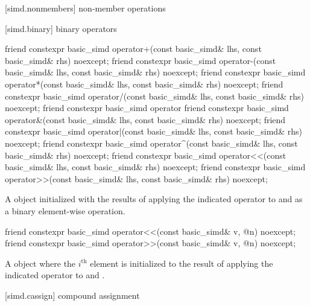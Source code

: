 [simd.nonmembers]{ non-member operations}

[simd.binary]{ binary operators}

\begin{itemdecl}
friend constexpr basic_simd operator+(const basic_simd& lhs, const basic_simd& rhs) noexcept;
friend constexpr basic_simd operator-(const basic_simd& lhs, const basic_simd& rhs) noexcept;
friend constexpr basic_simd operator*(const basic_simd& lhs, const basic_simd& rhs) noexcept;
friend constexpr basic_simd operator/(const basic_simd& lhs, const basic_simd& rhs) noexcept;
friend constexpr basic_simd operator%
friend constexpr basic_simd operator&(const basic_simd& lhs, const basic_simd& rhs) noexcept;
friend constexpr basic_simd operator|(const basic_simd& lhs, const basic_simd& rhs) noexcept;
friend constexpr basic_simd operator^(const basic_simd& lhs, const basic_simd& rhs) noexcept;
friend constexpr basic_simd operator<<(const basic_simd& lhs, const basic_simd& rhs) noexcept;
friend constexpr basic_simd operator>>(const basic_simd& lhs, const basic_simd& rhs) noexcept;
\end{itemdecl}

\begin{itemdescr}
  \pnum\ConstraintOperatorTWellFormed

  \pnum\returns
  A  object initialized with the results of applying the indicated operator to  and  as a binary element-wise operation.
\end{itemdescr}

\begin{itemdecl}
friend constexpr basic_simd operator<<(const basic_simd& v, @\simdsizetype@ n) noexcept;
friend constexpr basic_simd operator>>(const basic_simd& v, @\simdsizetype@ n) noexcept;
\end{itemdecl}

\begin{itemdescr}
  \pnum\ConstraintOperatorTWellFormed

  \pnum\returns
  A  object where the $i^\text{th}$ element is initialized to the result of applying the indicated operator to  and  \foralli.
\end{itemdescr}

[simd.cassign]{ compound assignment}

